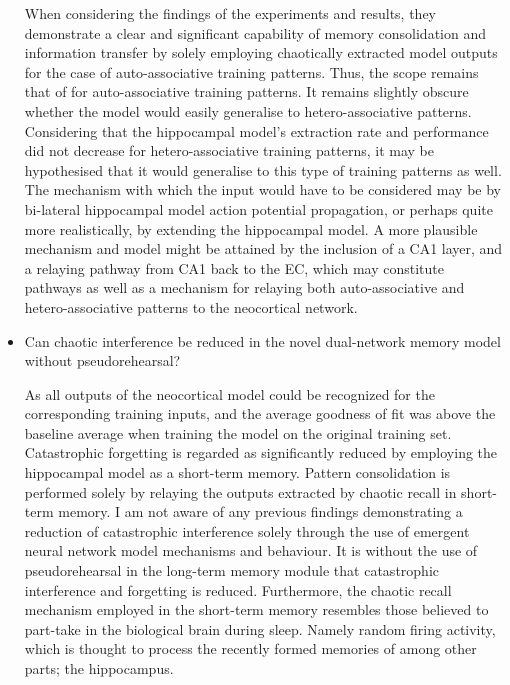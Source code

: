\begin{itemize}
    When considering the findings of the experiments and results, they demonstrate a clear and significant capability of memory consolidation and information transfer by solely employing chaotically extracted model outputs for the case of auto-associative training patterns. Thus, the scope remains that of for auto-associative training patterns. It remains slightly obscure whether the model would easily generalise to hetero-associative patterns. Considering that the hippocampal model's extraction rate and performance did not decrease for hetero-associative training patterns, it may be hypothesised that it would generalise to this type of training patterns as well. The mechanism with which the input would have to be considered may be by bi-lateral hippocampal model action potential propagation, or perhaps quite more realistically, by extending the hippocampal model. A more plausible mechanism and model might be attained by the inclusion of a CA1 layer, and a relaying pathway from CA1 back to the EC, which may constitute pathways as well as a mechanism for relaying both auto-associative and hetero-associative patterns to the neocortical network.
    
    \item Can chaotic interference be reduced in the novel dual-network memory model without pseudorehearsal?
    
    As all outputs of the neocortical model could be recognized for the corresponding training inputs, and the average goodness of fit was above the baseline average when training the model on the original training set. Catastrophic forgetting is regarded as significantly reduced by employing the hippocampal model as a short-term memory. Pattern consolidation is performed solely by relaying the outputs extracted by chaotic recall in short-term memory. I am not aware of any previous findings demonstrating a reduction of catastrophic interference solely through the use of emergent neural network model mechanisms and behaviour. It is without the use of pseudorehearsal in the long-term memory module that catastrophic interference and forgetting is reduced. Furthermore, the chaotic recall mechanism employed in the short-term memory resembles those believed to part-take in the biological brain during sleep. Namely random firing activity, which is thought to process the recently formed memories of among other parts; the hippocampus.
    
\end{itemize}



